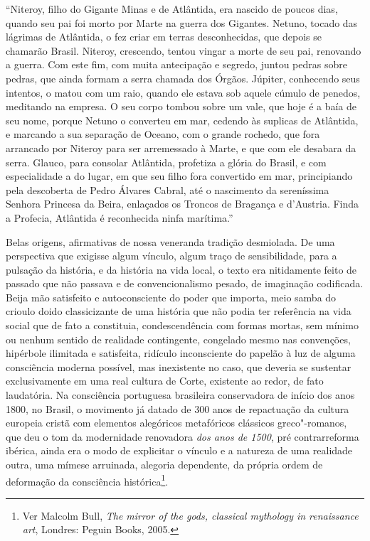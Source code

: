 ``Niteroy, filho do Gigante Minas e de Atlântida, era nascido de poucos
dias, quando seu pai foi morto por Marte na guerra dos Gigantes. Netuno,
tocado das lágrimas de Atlântida, o fez criar em terras desconhecidas,
que depois se chamarão Brasil. Niteroy, crescendo, tentou vingar a morte
de seu pai, renovando a guerra. Com este fim, com muita antecipação e
segredo, juntou pedras sobre pedras, que ainda formam a serra chamada
dos Órgãos. Júpiter, conhecendo seus intentos, o matou com um raio,
quando ele estava sob aquele cúmulo de penedos, meditando na empresa. O
seu corpo tombou sobre um vale, que hoje é a baía de seu nome, porque
Netuno o converteu em mar, cedendo às suplicas de Atlântida, e marcando
a sua separação de Oceano, com o grande rochedo, que fora arrancado por
Niteroy para ser arremessado à Marte, e que com ele desabara da serra.
Glauco, para consolar Atlântida, profetiza a glória do Brasil, e com
especialidade a do lugar, em que seu filho fora convertido em mar,
principiando pela descoberta de Pedro Álvares Cabral, até o nascimento
da sereníssima Senhora Princesa da Beira, enlaçados os Troncos de
Bragança e d'Austria. Finda a Profecia, Atlântida é reconhecida ninfa
marítima.''

Belas origens, afirmativas de nossa veneranda tradição desmiolada. De
uma perspectiva que exigisse algum vínculo, algum traço de
sensibilidade, para a pulsação da história, e da história na vida local,
o texto era nitidamente feito de passado que não passava e de
convencionalismo pesado, de imaginação codificada. Beija mão satisfeito
e autoconsciente do poder que importa, meio samba do crioulo doido
classicizante de uma história que não podia ter referência na vida
social que de fato a constituia, condescendência com formas mortas, sem
mínimo ou nenhum sentido de realidade contingente, congelado mesmo nas
convenções, hipérbole ilimitada e satisfeita, ridículo inconsciente do
papelão à luz de alguma consciência moderna possível, mas inexistente no
caso, que deveria se sustentar exclusivamente em uma real cultura de
Corte, existente ao redor, de fato laudatória. Na consciência portuguesa
brasileira conservadora de início dos anos 1800, no Brasil, o movimento
já datado de 300 anos de repactuação da cultura europeia cristã com
elementos alegóricos metafóricos clássicos greco"-romanos, que deu o tom
da modernidade renovadora \emph{dos anos de 1500}, pré contrarreforma
ibérica, ainda era o modo de explicitar o vínculo e a natureza de uma
realidade outra, uma mímese arruinada, alegoria dependente, da própria
ordem de deformação da consciência histórica\footnote{Ver Malcolm Bull,
  \emph{The mirror of the gods, classical mythology in renaissance art},
  Londres: Peguin Books, 2005.}.


